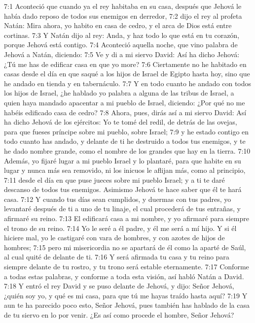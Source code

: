 7:1 Aconteció que cuando ya el rey habitaba en su casa, después que Jehová le había dado reposo de todos sus enemigos en derredor,  
7:2 dijo el rey al profeta Natán: Mira ahora, yo habito en casa de cedro, y el arca de Dios está entre cortinas.  
7:3 Y Natán dijo al rey: Anda, y haz todo lo que está en tu corazón, porque Jehová está contigo.  
7:4 Aconteció aquella noche, que vino palabra de Jehová a Natán, diciendo:  
7:5 Ve y di a mi siervo David: Así ha dicho Jehová: ¿Tú me has de edificar casa en que yo more?  
7:6 Ciertamente no he habitado en casas desde el día en que saqué a los hijos de Israel de Egipto hasta hoy, sino que he andado en tienda y en tabernáculo.  
7:7 Y en todo cuanto he andado con todos los hijos de Israel, ¿he hablado yo palabra a alguna de las tribus de Israel, a quien haya mandado apacentar a mi pueblo de Israel, diciendo: ¿Por qué no me habéis edificado casa de cedro?  
7:8 Ahora, pues, dirás así a mi siervo David: Así ha dicho Jehová de los ejércitos: Yo te tomé del redil, de detrás de las ovejas, para que fueses príncipe sobre mi pueblo, sobre Israel;  
7:9 y he estado contigo en todo cuanto has andado, y delante de ti he destruido a todos tus enemigos, y te he dado nombre grande, como el nombre de los grandes que hay en la tierra.  
7:10 Además, yo fijaré lugar a mi pueblo Israel y lo plantaré, para que habite en su lugar y nunca más sea removido, ni los inicuos le aflijan más, como al principio,  
7:11 desde el día en que puse jueces sobre mi pueblo Israel; y a ti te daré descanso de todos tus enemigos. Asimismo Jehová te hace saber que él te hará casa.  
7:12 Y cuando tus días sean cumplidos, y duermas con tus padres, yo levantaré después de ti a uno de tu linaje, el cual procederá de tus entrañas, y afirmaré su reino.  
7:13 El edificará casa a mi nombre, y yo afirmaré para siempre el trono de su reino.  
7:14 Yo le seré a él padre, y él me será a mí hijo. Y si él hiciere mal, yo le castigaré con vara de hombres, y con azotes de hijos de hombres;  
7:15 pero mi misericordia no se apartará de él como la aparté de Saúl, al cual quité de delante de ti.  
7:16 Y será afirmada tu casa y tu reino para siempre delante de tu rostro, y tu trono será estable eternamente.  
7:17 Conforme a todas estas palabras, y conforme a toda esta visión, así habló Natán a David.  
7:18 Y entró el rey David y se puso delante de Jehová, y dijo: Señor Jehová, ¿quién soy yo, y qué es mi casa, para que tú me hayas traído hasta aquí?  
7:19 Y aun te ha parecido poco esto, Señor Jehová, pues también has hablado de la casa de tu siervo en lo por venir. ¿Es así como procede el hombre, Señor Jehová?  
